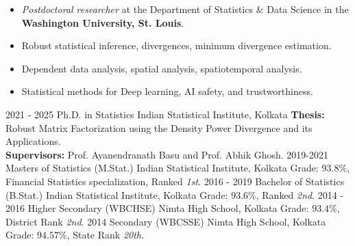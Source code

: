 \documentclass[11pt]{developercv} %
\begin{document}
\begin{itemize}[noitemsep, leftmargin=*]
    \item \emph{Postdoctoral researcher} at the Department of Statistics \& Data Science in the \textbf{Washington University, St. Louis}.
\end{itemize}

\vspace*{-0.4cm}
\vspace{-15pt}


\begin{itemize}[noitemsep, leftmargin=*]
    \item Robust statistical inference, divergences, minimum divergence estimation.
    \item Dependent data analysis, spatial analysis, spatiotemporal analysis.
    \item Statistical methods for Deep learning, AI safety, and trustworthiness.
\end{itemize}

{}
\begin{entrylist}
    \entry
    {2021 - 2025}
    {Ph.D. in Statistics}
    {Indian Statistical Institute, Kolkata}
    {\textbf{Thesis:} Robust Matrix Factorization using the Density Power Divergence and its Applications. \\
    \textbf{Supervisors:} Prof. Ayanendranath Basu and Prof. Abhik Ghosh.}
    \entry
    {2019-2021}
    {Masters of Statistics (M.Stat.)}
    {Indian Statistical Institute, Kolkata}
    {Grade: $93.8\%$, Financial Statistics specialization, Ranked \emph{1st}.}
    \entry
    {2016 - 2019}
    {Bachelor of Statistics (B.Stat.)}
    {Indian Statistical Institute, Kolkata}
    {Grade: $93.6\%$, Ranked \emph{2nd}.}
    \entry
    {2014 - 2016}
    {Higher Secondary (WBCHSE)}
    {Nimta High School, Kolkata}
    {Grade: $93.4\%$, District Rank \emph{2nd}.}
    \entry
    {2014}
    {Secondary (WBCSSE)}
    {Nimta High School, Kolkata}
    {Grade: $94.57\%$, State Rank \emph{20th}.}
\end{entrylist}
\end{document}
